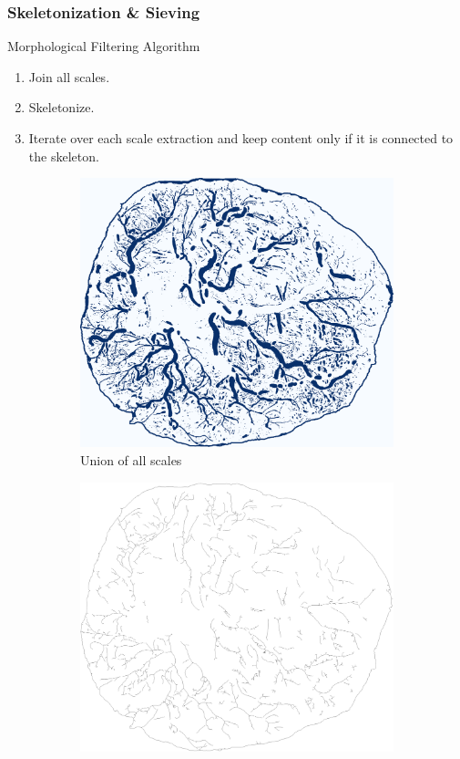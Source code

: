 \documentclass[9pt,notes]{beamer}
\begin{document}
\begin{frame}
	\frametitle{Skeletonization \& Sieving}
	\begin{block}{Morphological Filtering Algorithm}
		\begin{enumerate}[\bfseries(a)]
			\item Join all scales.
			\item Skeletonize.
			\item Iterate over each scale extraction and keep content only if it is connected to the skeleton.
		\end{enumerate}
	\end{block}
	\begin{figure}
		\begin{subfigure}[b]{0.30\textwidth}
			\includegraphics[width=\textwidth]{D-cumulative_binary}
			\caption{Union of all scales}
		\end{subfigure}
		\begin{subfigure}[b]{0.30\textwidth}
			\includegraphics[width=\textwidth]{F-small_skel}

\end{subfigure}
\end{figure}
\end{frame}
\end{document}
